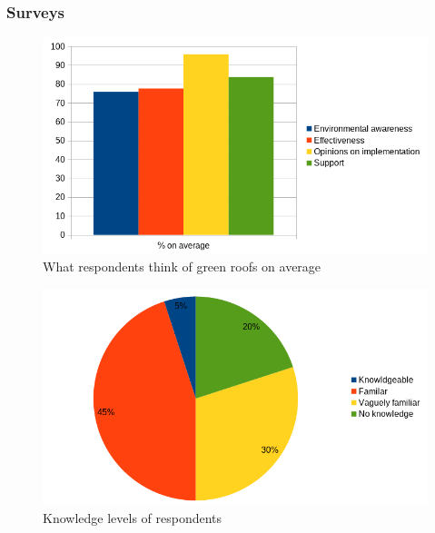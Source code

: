 \documentclass[a4paper]{article}
\begin{document}
\begin{multicols}{2}
  \subsubsection{Surveys}

  \begin{figure}[H]
    \Centering
    \includegraphics[width=\linewidth]{responses-ave.png}
    \caption{What respondents think of green roofs on average}
    \label{fig:surv-resp}
  \end{figure}

  \begin{figure}[H]
    \Centering
    \includegraphics[width=\linewidth]{knowledge.png}
    \caption{Knowledge levels of respondents}
    \label{fig:know-levels}
  \end{figure}


\end{multicols}
\end{document}
